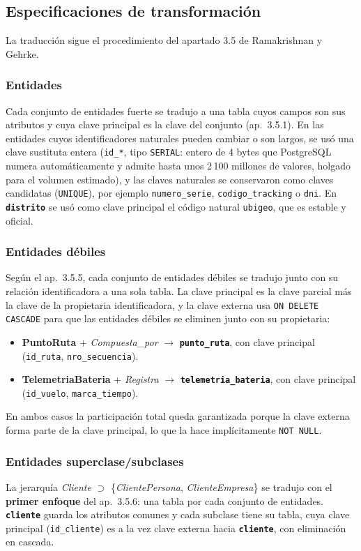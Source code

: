 \documentclass[11pt,a4paper]{article}
\newcommand{\tb}[1]{\textbf{\texttt{#1}}}
\newcommand{\at}[1]{\texttt{#1}}
\begin{document}
\subsection{Especificaciones de transformación}
La traducción sigue el procedimiento del apartado 3.5 de Ramakrishnan y Gehrke.

\subsubsection{Entidades}
Cada conjunto de entidades fuerte se tradujo a una tabla cuyos campos son sus atributos y cuya clave principal es la clave del conjunto (ap.~3.5.1). En las entidades cuyos identificadores naturales pueden cambiar o son largos, se usó una clave sustituta entera (\at{id\_*}, tipo \texttt{SERIAL}: entero de 4 bytes que PostgreSQL numera automáticamente y admite hasta unos 2\,100 millones de valores, holgado para el volumen estimado), y las claves naturales se conservaron como claves candidatas (\texttt{UNIQUE}), por ejemplo \at{numero\_serie}, \at{codigo\_tracking} o \at{dni}. En \tb{distrito} se usó como clave principal el código natural \at{ubigeo}, que es estable y oficial.

\subsubsection{Entidades débiles}
Según el ap.~3.5.5, cada conjunto de entidades débiles se tradujo junto con su relación identificadora a una sola tabla. La clave principal es la clave parcial más la clave de la propietaria identificadora, y la clave externa usa \texttt{ON DELETE CASCADE} para que las entidades débiles se eliminen junto con su propietaria:
\begin{itemize}
\item \textbf{PuntoRuta} + \textit{Compuesta\_por} $\rightarrow$ \tb{punto\_ruta}, con clave principal (\at{id\_ruta}, \at{nro\_secuencia}).
\item \textbf{TelemetriaBateria} + \textit{Registra} $\rightarrow$ \tb{telemetria\_bateria}, con clave principal (\at{id\_vuelo}, \at{marca\_tiempo}).
\end{itemize}
En ambos casos la participación total queda garantizada porque la clave externa forma parte de la clave principal, lo que la hace implícitamente \texttt{NOT NULL}.

\subsubsection{Entidades superclase/subclases}
La jerarquía \textit{Cliente} $\supset$ \{\textit{ClientePersona}, \textit{ClienteEmpresa}\} se tradujo con el \textbf{primer enfoque} del ap.~3.5.6: una tabla por cada conjunto de entidades. \tb{cliente} guarda los atributos comunes y cada subclase tiene su tabla, cuya clave principal (\at{id\_cliente}) es a la vez clave externa hacia \tb{cliente}, con eliminación en cascada.
\end{document}
